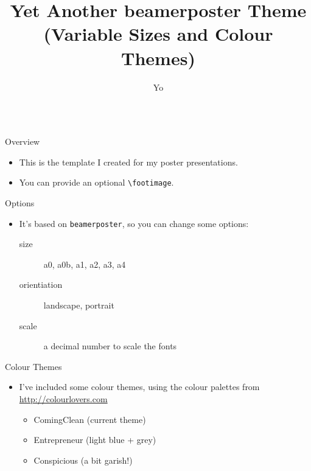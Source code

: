 \documentclass{beamer}
\author[person@person.com]{Yo}
\title{Yet Another beamerposter Theme\\(Variable Sizes and Colour Themes)}
\institute{Your Institution}
\begin{document}
\begin{frame}[fragile]\centering
	\begin{columns}[T]
		\begin{column}{.46\textwidth}
			\begin{block}{Overview}
				\begin{itemize}
					\item This is the template I created for my poster presentations.
					\item You can provide an optional \verb|\footimage|.
				\end{itemize}
			\end{block}
			\begin{block}{Options}
				\begin{itemize}
					\item It's based on \texttt{beamerposter}, so you can change some options:
						\begin{description}
							\item[size] a0, a0b, a1, a2, a3, a4
							\item[orientiation] landscape, portrait
							\item[scale] a decimal number to scale the fonts
						\end{description}
				\end{itemize}
			\end{block}
			\begin{block}{Colour Themes}
				\begin{itemize}
					\item I've included some colour themes, using the colour palettes from \url{http://colourlovers.com}
						\begin{itemize}
							\item ComingClean (current theme)
							\item Entrepreneur (light blue + grey)
							\item Conspicious (a bit garish!)
						\end{itemize}
				\end{itemize}
			\end{block}
		\end{column}

		\begin{column}{.46\textwidth}


\end{column}
\end{columns}
\end{frame}
\end{document}
